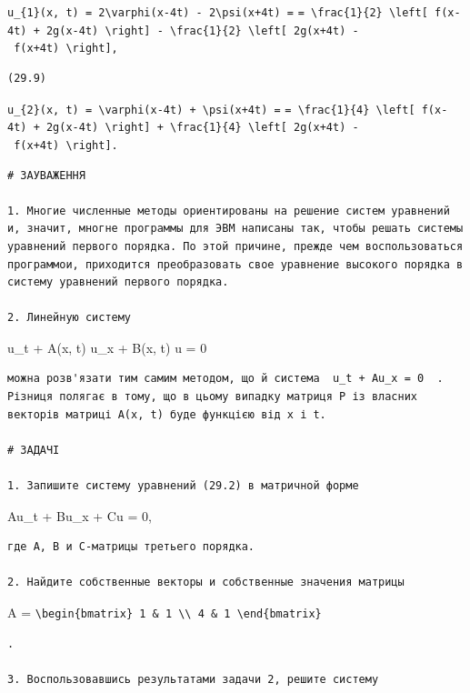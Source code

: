 \documentclass[
  ukrainian,
]{article}
\begin{document}
\texttt{u\_\{1\}(x,\ t)\ =\ 2\textbackslash{}varphi(x-4t)\ -\ 2\textbackslash{}psi(x+4t)\ =}
\texttt{=\ \textbackslash{}frac\{1\}\{2\}\ \textbackslash{}left{[}\ f(x-4t)\ +\ 2g(x-4t)\ \textbackslash{}right{]}\ -\ \textbackslash{}frac\{1\}\{2\}\ \textbackslash{}left{[}\ 2g(x+4t)\ -\ f(x+4t)\ \textbackslash{}right{]},}

\begin{verbatim}
(29.9)
\end{verbatim}

\texttt{u\_\{2\}(x,\ t)\ =\ \textbackslash{}varphi(x-4t)\ +\ \textbackslash{}psi(x+4t)\ =}
\texttt{=\ \textbackslash{}frac\{1\}\{4\}\ \textbackslash{}left{[}\ f(x-4t)\ +\ 2g(x-4t)\ \textbackslash{}right{]}\ +\ \textbackslash{}frac\{1\}\{4\}\ \textbackslash{}left{[}\ 2g(x+4t)\ -\ f(x+4t)\ \textbackslash{}right{]}.}

\begin{verbatim}
# ЗАУВАЖЕННЯ

1. Многие численные методы ориентированы на решение систем уравнений и, значит, многне программы для ЭВМ написаны так, чтобы решать системы уравнений первого порядка. По этой причине, прежде чем воспользоваться программои, приходится преобразовать свое уравнение высокого порядка в систему уравнений первого порядка.

2. Линейную систему
\end{verbatim}

u\_t + A(x, t) u\_x + B(x, t) u = 0

\begin{verbatim}
можна розв'язати тим самим методом, що й система  u_t + Au_x = 0  . Різниця полягає в тому, що в цьому випадку матриця P із власних векторів матриці A(x, t) буде функцією від x і t.

# ЗАДАЧІ

1. Запишите систему уравнений (29.2) в матричной форме
\end{verbatim}

Au\_t + Bu\_x + Cu = 0,

\begin{verbatim}
где A, B и C-матрицы третьего порядка.

2. Найдите собственные векторы и собственные значения матрицы
\end{verbatim}

A =
\texttt{\textbackslash{}begin\{bmatrix\}\ 1\ \&\ 1\ \textbackslash{}\textbackslash{}\ 4\ \&\ 1\ \textbackslash{}end\{bmatrix\}}

\begin{verbatim}
.

3. Воспользовавшись результатами задачи 2, решите систему
\end{verbatim}
\end{document}
